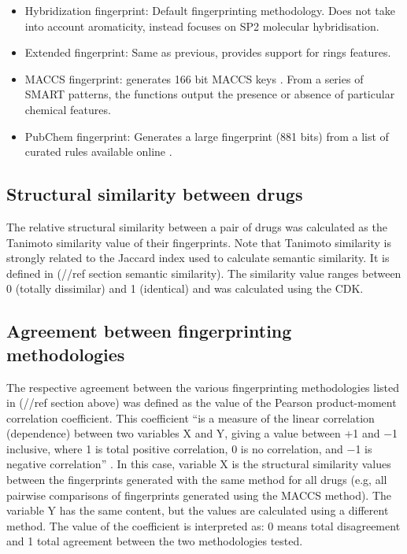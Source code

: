\begin{itemize}
  \item Hybridization fingerprint: Default fingerprinting methodology. Does not take into account aromaticity, instead focuses on SP2 molecular hybridisation.
  \item Extended fingerprint: Same as previous, provides support for rings features.
  \item MACCS fingerprint: generates 166 bit MACCS keys \citep{fpdalke}. From a series of SMART patterns, the functions output the presence or absence of particular chemical features.
  \item PubChem fingerprint: Generates a large fingerprint (881 bits) from a list of curated rules available online \citep{pubchemfp}.
\end{itemize}

\subsection{Structural similarity between drugs}
The relative structural similarity between a pair of drugs was calculated as the Tanimoto similarity value \citep{tanimoto1958elementary} of their fingerprints. Note that Tanimoto similarity is strongly related to the Jaccard index used to calculate semantic similarity. It is defined in (//ref section semantic similarity). The similarity value ranges between 0 (totally dissimilar) and 1 (identical) and was calculated using the CDK.

\subsection{Agreement between fingerprinting methodologies}
The respective agreement between the various fingerprinting methodologies listed in (//ref section above) was defined as the value of the Pearson product-moment correlation coefficient. This coefficient “is a measure of the linear correlation (dependence) between two variables X and Y, giving a value between +1 and −1 inclusive, where 1 is total positive correlation, 0 is no correlation, and −1 is negative correlation” \citep{hane1993pearson}. In this case, variable X is the structural similarity values between the fingerprints generated with the same method for all drugs (e.g, all pairwise comparisons of fingerprints generated using the MACCS method). The variable Y has the same content, but the values are calculated using a different method. The value of the coefficient is interpreted as: 0 means total disagreement and 1 total agreement between the two methodologies tested.

